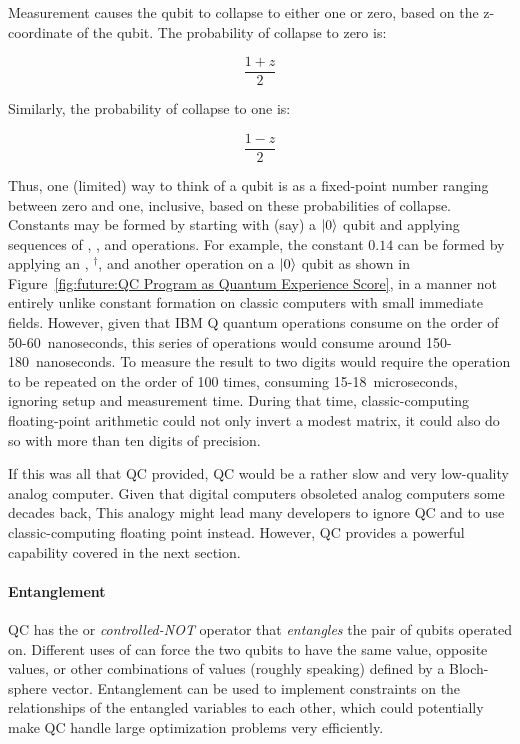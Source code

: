Measurement causes the qubit to collapse to either one or zero, based
on the z-coordinate of the qubit.
The probability of collapse to zero is:

\begin{equation}
	\frac{1+z}{2}
\end{equation}

Similarly, the probability of collapse to one is:

\begin{equation}
	\frac{1-z}{2}
\end{equation}

Thus, one (limited) way to think of a qubit is as a fixed-point number
ranging between zero and one, inclusive, based on these probabilities
of collapse.
Constants may be formed by starting with (say) a $\ket{0}$ qubit and
applying sequences of , , and  operations.
For example, the constant $0.14$ can be formed by applying an
, $^\dagger$, and another 
operation on a $\ket{0}$ qubit as shown in
Figure~\ref{fig:future:QC Program as Quantum Experience Score},
in a manner not entirely unlike constant formation on classic
computers with small immediate fields.
However, given that IBM Q quantum operations consume on the
order of 50-60~nanoseconds, this series of operations would
consume around 150-180~nanoseconds.
To measure the result to two digits would require the operation to
be repeated on the order of 100 times, consuming 15-18~microseconds,
ignoring setup and measurement time.
During that time, classic-computing floating-point arithmetic could not
only invert a modest matrix, it could also do so with more than
ten digits of precision.

If this was all that QC provided, QC would be a rather slow and very
low-quality analog computer.
Given that digital computers obsoleted analog computers some decades back,
This analogy might lead many developers to ignore QC and to
use classic-computing floating point instead.
However, QC provides a powerful capability covered in the next section.

\paragraph{Entanglement}

QC has the  or \emph{controlled-NOT} operator that
\emph{entangles} the pair of qubits operated on.
Different uses of  can force the two qubits to have the same
value, opposite values, or other combinations of values (roughly speaking)
defined by a Bloch-sphere vector.
Entanglement can be used to implement constraints
on the relationships of the entangled variables to each other, which
could potentially make QC handle large optimization problems very
efficiently.

